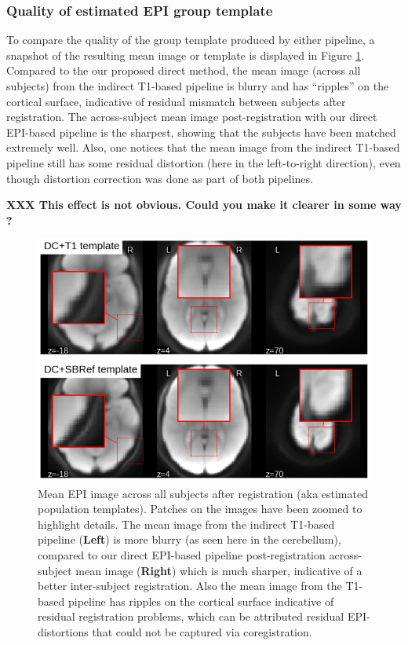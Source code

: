 \subsubsection{Quality of estimated EPI group template}
To compare the quality of the group template produced by either pipeline, a snapshot of the resulting mean image or template is displayed in
Figure \ref{fig:template}. Compared to the our proposed direct method,
the mean image (across all subjects) from the indirect T1-based
pipeline is blurry and has ``ripples'' on the cortical surface,
indicative of residual mismatch between subjects after
registration. The across-subject mean image post-registration with our
direct EPI-based pipeline is the sharpest, showing that the subjects
have been matched extremely well. Also, one notices that the mean image from
the indirect T1-based pipeline still has some residual distortion (here in the
left-to-right direction), even though distortion correction was done as part of both pipelines.

\textbf{XXX This effect is not obvious. Could you make it clearer in some way ?}

\begin{figure}[!htbp]
  \includegraphics[width=1\linewidth]{figures/template.png}
\caption{Mean EPI image
  across all subjects after registration (aka estimated population
  templates). Patches on the images have been zoomed to highlight
  details. The mean image from the indirect T1-based
  pipeline (\textbf{Left}) is more blurry (as seen here in the
  cerebellum), compared to
  our direct EPI-based pipeline post-registration across-subject mean
  image (\textbf{Right}) which is much sharper, indicative of a
  better inter-subject
  registration. Also the mean image from the T1-based pipeline has
  ripples on the cortical surface indicative of residual registration
  problems, which can be attributed residual EPI-distortions that
  could not be captured via coregistration.}
\label{fig:template}
\end{figure}


